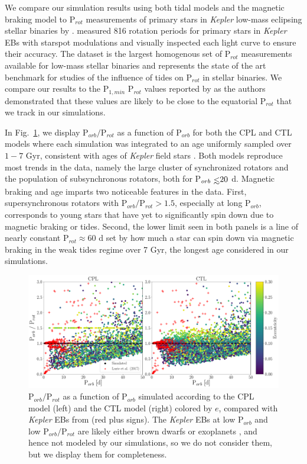 \documentclass[twocolumn]{aastex61}
\def\lsim{~\rlap{$<$}{\lower 1.0ex\hbox{$\sim$}}}
\newcommand{\kepler}[0]{\textit{Kepler}\xspace}
\begin{document}
We compare our simulation results using both tidal models and the \citet{Matt2015} magnetic braking model to P$_{rot}$ measurements of primary stars in \kepler low-mass eclipsing stellar binaries by \citet{Lurie2017}.  \citet{Lurie2017} measured 816 rotation periods for primary stars in \kepler EBs with starspot modulations and visually inspected each light curve to ensure their accuracy. The \citet{Lurie2017} dataset is the largest homogenous set of P$_{rot}$ measurements available for low-mass stellar binaries and represents the state of the art benchmark for studies of the influence of tides on P$_{rot}$ in stellar binaries. We compare our results to the P$_{1,min}$ P$_{rot}$ values reported by \citet{Lurie2017} as the authors demonstrated that these values are likely to be close to the equatorial P$_{rot}$ that we track in our simulations.

In Fig.~\ref{fig:lurie7}, we display P$_{orb}/$P$_{rot}$ as a function of P$_{orb}$ for both the CPL and CTL models where each simulation was integrated to an age uniformly sampled over $1-7$ Gyr, consistent with ages of \kepler field stars \citep{Chaplin2014}.  Both models reproduce most trends in the \citet{Lurie2017} data, namely the large cluster of synchronized rotators and the population of subsynchronous rotators, both for P$_{orb} \lsim 20$ d. Magnetic braking and age imparts two noticeable features in the data. First, supersynchronous rotators with P$_{orb}/$P$_{rot} > 1.5$, especially at long P$_{orb}$, corresponds to young stars that have yet to significantly spin down due to magnetic braking or tides.  Second, the lower limit seen in both panels is a line of nearly constant P$_{rot} \approx 60$ d set by how much a star can spin down via magnetic braking in the weak tides regime over 7 Gyr, the longest age considered in our simulations.  

\begin{figure}[t]
	\includegraphics[width=\textwidth]{../Plots/lurieFig7.pdf}
   \caption{P$_{orb}/$P$_{rot}$ as a function of P$_{orb}$ simulated according to the CPL model (left) and the CTL model (right) colored by $e$, compared with \kepler EBs from \citet{Lurie2017} (red plus signs).  The \kepler EBs at low P$_{orb}$ and low P$_{orb}/$P$_{rot}$ are likely either brown dwarfs or exoplanets \citep{Lurie2017}, and hence not modeled by our simulations, so we do not consider them, but we display them for completeness.}%
    \label{fig:lurie7}%
\end{figure}
\end{document}
